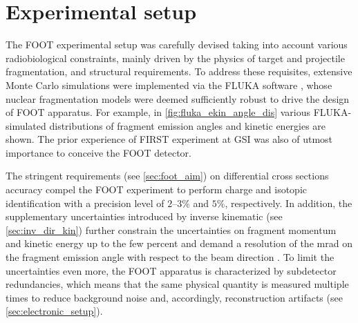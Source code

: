 \section{Experimental setup}\label{sec:experimental_setup}
The FOOT experimental setup was carefully devised taking into account various radiobiological constraints, mainly driven by the physics of target and projectile fragmentation, and structural requirements. To address these requisites, extensive Monte Carlo simulations were implemented via the FLUKA software \cite{Ferrari:2005zk,BOHLEN2014211}, whose nuclear fragmentation models were deemed sufficiently robust to drive the design of FOOT apparatus. For example, in \autoref{fig:fluka_ekin_angle_dis} various FLUKA-simulated distributions of fragment emission angles and kinetic energies are shown. The prior experience of FIRST experiment at GSI \cite{PhysRevC.93.064601} was also of utmost importance to conceive the FOOT detector.

The stringent requirements (see \autoref{sec:foot_aim}) on differential cross sections accuracy compel the FOOT experiment to perform charge and isotopic identification with a precision level of $2$--$3\%$ and $5\%$, respectively. In addition, the supplementary uncertainties introduced by inverse kinematic (see \autoref{sec:inv_dir_kin}) further constrain the uncertainties on fragment momentum and kinetic energy up to the few percent and demand a resolution of the mrad on the fragment emission angle with respect to the beam direction \cite{foot_cdr}. To limit the uncertainties even more, the FOOT apparatus is characterized by subdetector redundancies, which means that the same physical quantity is measured multiple times to reduce background noise and, accordingly, reconstruction artifacts (see \autoref{sec:electronic_setup}).

